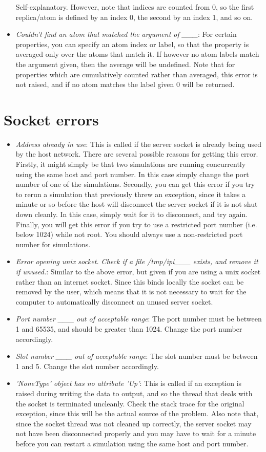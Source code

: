 \documentclass[11pt,english,fleqn]{report}
\begin{document}
\begin{itemize}
Self-explanatory. However, note that indices are counted from 0, so
the first replica/atom is defined by an index 0, the second by an
index 1, and so on.
\item \emph{Couldn't find an atom that matched the argument of \_\_\_}:
For certain properties, you can specify an atom index or label, so
that the property is averaged only over the atoms that match it. If
however no atom labels match the argument given, then the average
will be undefined. Note that for properties which are cumulatively
counted rather than averaged, this error is not raised, and if no
atom matches the label given 0 will be returned.
\end{itemize}

\section{Socket errors}
\begin{itemize}
\item \emph{Address already in use}: This is called if the server socket
is already being used by the host network. There are several possible
reasons for getting this error. Firstly, it might simply be that two
simulations are running concurrently using the same host and port
number. In this case simply change the port number of one of the simulations.
Secondly, you can get this error if you try to rerun a simulation
that previously threw an exception, since it takes a minute or so
before the host will disconnect the server socket if it is not shut
down cleanly. In this case, simply wait for it to disconnect, and
try again. Finally, you will get this error if you try to use a restricted
port number (i.e. below 1024) while not root. You should always use
a non-restricted port number for \ipi simulations.
\item \emph{Error opening unix socket. Check if a file /tmp/ipi\_\_\_ exists, and remove it if unused.}:
Similar to the above error, but given if you are using a unix socket
rather than an internet socket. Since this binds locally the socket
can be removed by the user, which means that it is not necessary to
wait for the computer to automatically disconnect an unused server
socket.
\item \emph{Port number \_\_\_ out of acceptable range}: The port number
must be between 1 and 65535, and should be greater than 1024. Change
the port number accordingly.
\item \emph{Slot number \_\_\_ out of acceptable range}: The slot number
must be between 1 and 5. Change the slot number accordingly.
\item \emph{'NoneType' object has no attribute 'Up'}: This is called if
an exception is raised during writing the data to output, and so the
thread that deals with the socket is terminated uncleanly. Check the
stack trace for the original exception, since this will be the actual
source of the problem. Also note that, since the socket thread was
not cleaned up correctly, the server socket may not have been disconnected
properly and you may have to wait for a minute before you can restart
a simulation using the same host and port number.
\end{itemize}
\end{document}
